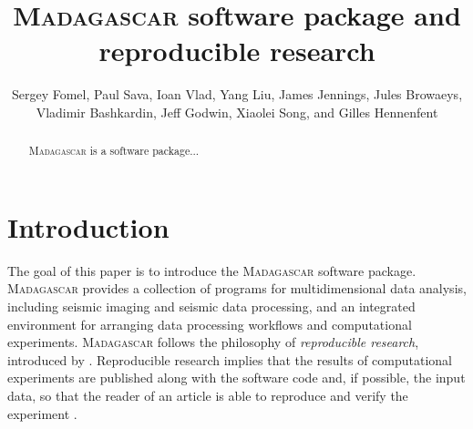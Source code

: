 \title{\textsc{Madagascar} software package and reproducible research}

\renewcommand{\thefootnote}{\fnsymbol{footnote}} 

\author{Sergey Fomel\footnotemark[1], Paul Sava\footnotemark[2], Ioan Vlad\footnotemark[3], Yang Liu\footnotemark[1], James Jennings\footnotemark[4], 
Jules Browaeys\footnotemark[5], Vladimir Bashkardin\footnotemark[1], Jeff Godwin\footnotemark[2], Xiaolei Song\footnotemark[1], and Gilles Hennenfent\footnotemark[6]}


\address{
\footnotemark[1]Bureau of Economic Geology, \\
John A. and Katherine G. Jackson School of Geosciences \\ The
University of Texas at Austin \\ University Station, Box X \\ Austin,
TX 78713-8972 \\
\footnotemark[2] Department of Geophysics \\
Colorado School of Mines \\
Golden, CO 80401 \\
\footnotemark[3] Statoil \\
\footnotemark[4] Shell \\
\footnotemark[5] Total \\
\footnotemark[6] Chevron}


\maketitle

\begin{abstract}
  \textsc{Madagascar} is a software package...
\end{abstract}

\section{Introduction}

The goal of this paper is to introduce the \textsc{Madagascar}
software package. \textsc{Madagascar} provides a collection of
programs for multidimensional data analysis, including seismic imaging
and seismic data processing, and an integrated environment for
arranging data processing workflows and computational
experiments. \textsc{Madagascar} follows the philosophy of
\emph{reproducible research}, introduced by \cite{SEG-1992-0601}.
Reproducible research implies that the results of computational
experiments are published along with the software code and, if
possible, the input data, so that the reader of an article is able to
reproduce and verify the experiment \cite[]{matt,intro}.

